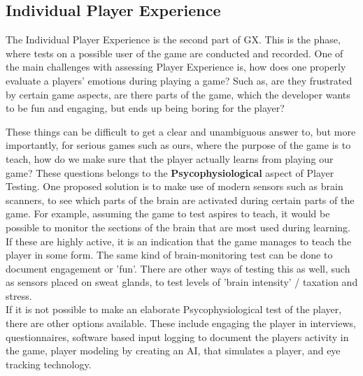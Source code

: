 \subsection{Individual Player Experience}
The Individual Player Experience is the second part of GX.
This is the phase, where tests on a possible user of the game are conducted and recorded.
One of the main challenges with assessing Player Experience is, how does one properly evaluate a players' emotions during playing a game?
Such as, are they frustrated by certain game aspects, are there parts of the game, which the developer wants to be fun and engaging, but ends up being boring for the player?

These things can be difficult to get a clear and unambiguous answer to, but more importantly, for serious games such as ours, where the purpose of the game is to teach, how do we make sure that the player actually learns from playing our game?
These questions belongs to the \textbf{Psycophysiological} aspect of Player Testing.
One proposed solution is to make use of modern sensors such as brain scanners, to see which parts of the brain are activated during certain parts of the game.
For example, assuming the game to test aspires to teach, it would be possible to monitor the sections of the brain that are most used during learning.
If these are highly active, it is an indication that the game manages to teach the player in some form.
The same kind of brain-monitoring test can be done to document engagement or 'fun'.
There are other ways of testing this as well, such as sensors placed on sweat glands, to test levels of 'brain intensity' / taxation and stress.\\

If it is not possible to make an elaborate Psycophysiological test of the player, there are other options available.
These include engaging the player in interviews, questionnaires, software based input logging to document the players activity in the game, player modeling by creating an AI, that simulates a player, and eye tracking technology\cite{gxmethod}.


